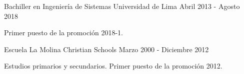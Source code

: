 

\begin{cventries}

  \cventry
    {Bachiller en Ingeniería de Sistemas} %
    {Universidad de Lima} %
    {} %
    {Abril 2013 - Agosto 2018} %
    {
      \begin{cvitems} %
        \item {Primer puesto de la promoción 2018-1.}
      \end{cvitems}
    }

  \cventry
    {Escuela} %
    {La Molina Christian Schools} %
    {} %
    {Marzo 2000 - Diciembre 2012} %
    {
      \begin{cvitems} %
        \item {Estudios primarios y secundarios. Primer puesto de la promoción 2012.}
      \end{cvitems}
    }

\end{cventries}

